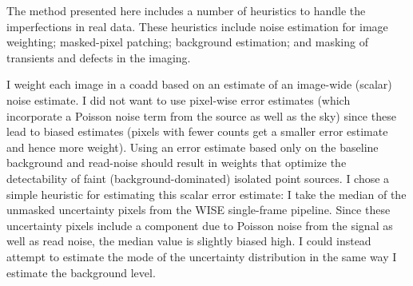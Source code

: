 \documentclass[11pt,preprint]{aastex}
\begin{document}


The method presented here includes a number of heuristics to handle
the imperfections in real data.  These heuristics include noise
estimation for image weighting; masked-pixel patching; background
estimation; and masking of transients and defects in the imaging.
%

I weight each image in a coadd based on an estimate of an
image-wide (scalar) noise estimate.  I did not want to use pixel-wise
error estimates (which incorporate a Poisson noise term from the
source as well as the sky) since these lead to biased estimates
(pixels with fewer counts get a smaller error estimate and hence more
weight).  Using an error estimate based only on the baseline
background and read-noise should result in weights that optimize the
detectability of faint (background-dominated) isolated point sources.
I chose a simple heuristic for estimating this scalar error estimate:
I take the median of the unmasked uncertainty pixels from the WISE
single-frame pipeline.  Since these uncertainty pixels include a
component due to Poisson noise from the signal as well as read noise,
the median value is slightly biased high.  I could instead attempt to
estimate the mode of the uncertainty distribution in the same way I
estimate the background level.
\end{document}
